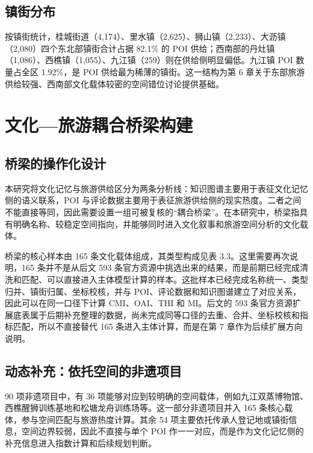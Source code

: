 \subsection{镇街分布}\label{ux9547ux8857ux5206ux5e03}

按镇街统计，桂城街道（4,174）、里水镇（2,625）、狮山镇（2,233）、大沥镇（2,080）四个东北部镇街合计占据 82.1\% 的 POI 供给；西南部的丹灶镇（1,086）、西樵镇（1,055）、九江镇（259）则在供给侧明显偏低。九江镇 POI 数量占全区 1.92\%，是 POI 供给最为稀薄的镇街。这一结构为第 6 章关于东部旅游供给较强、西南部文化载体较密的空间错位讨论提供基础。

\section{文化---旅游耦合桥梁构建}\label{ux6587ux5316ux65c5ux6e38ux8026ux5408ux6865ux6881ux6784ux5efa}

\subsection{桥梁的操作化设计}\label{ux6865ux6881ux7684ux64cdux4f5cux5316ux8bbeux8ba1}

本研究将文化记忆与旅游供给区分为两条分析线：知识图谱主要用于表征文化记忆侧的语义联系，POI 与评论数据主要用于表征旅游供给侧的现实热度。二者之间不能直接等同，因此需要设置一组可被复核的``耦合桥梁''。在本研究中，桥梁指具有明确名称、较稳定空间指向，并能够同时进入文化叙事和旅游空间分析的文化载体。

桥梁的核心样本由 165 条文化载体组成，其类型构成见表 3.3。这里需要再次说明，165 条并不是从后文 593 条官方资源中挑选出来的结果，而是前期已经完成清洗和匹配、可以直接进入主体模型计算的样本。这批样本已经完成名称统一、类型归并、镇街归属、坐标校核，并与 POI、评论数据和知识图谱建立了对应关系，因此可以在同一口径下计算 CMI、OAI、THI 和 MI。后文的 593 条官方资源扩展底表属于后期补充整理的数据，尚未完成同等口径的去重、合并、坐标校核和指标匹配，所以不直接替代 165 条进入主体计算，而是在第 7 章作为后续扩展方向说明。

\subsection{动态补充：依托空间的非遗项目}\label{ux52a8ux6001ux8865ux5145ux4f9dux6258ux7a7aux95f4ux7684ux975eux9057ux9879ux76ee}

90 项非遗项目中，有 36 项能够对应到较明确的空间载体，例如九江双蒸博物馆、西樵醒狮训练基地和松塘龙舟训练场等。这一部分非遗项目并入 165 条核心载体，参与空间匹配与旅游热度计算。其余 54 项主要依托传承人登记地或镇街信息，空间边界较弱，因此不直接与单个 POI 作一一对应，而是作为文化记忆侧的补充信息进入指数计算和后续规划判断。

